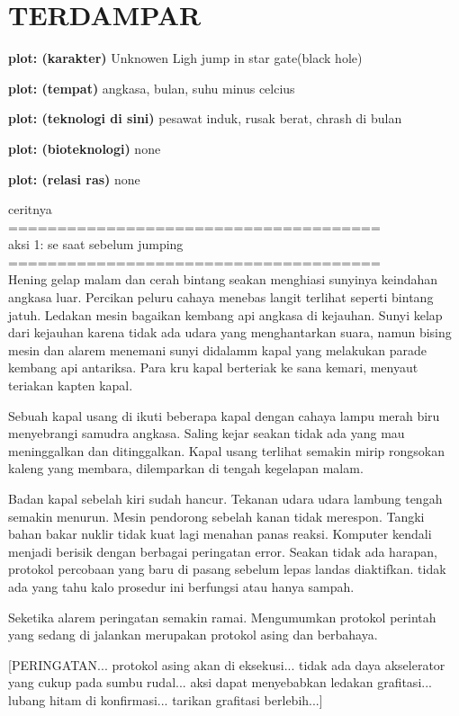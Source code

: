 \chapter{TERDAMPAR}

\textbf{plot: (karakter)} Unknowen Ligh jump in star gate(black hole)

\textbf{plot: (tempat)} angkasa, bulan, suhu minus celcius

\textbf{plot: (teknologi di sini)} pesawat induk, rusak berat, chrash di bulan

\textbf{plot: (bioteknologi)} none

\textbf{plot: (relasi ras)} none

ceritnya\\
======================================\\
aksi 1: se saat sebelum jumping\\
======================================\\

Hening gelap malam dan cerah bintang seakan menghiasi sunyinya keindahan angkasa luar. Percikan peluru cahaya menebas langit terlihat seperti bintang jatuh. Ledakan mesin bagaikan kembang api angkasa di kejauhan. Sunyi kelap dari kejauhan karena tidak ada udara yang menghantarkan suara, namun bising mesin dan alarem menemani sunyi didalamm kapal yang melakukan parade kembang api antariksa. Para kru kapal berteriak ke sana kemari, menyaut teriakan kapten kapal.

Sebuah kapal usang di ikuti beberapa kapal dengan cahaya lampu merah biru menyebrangi samudra angkasa. Saling kejar seakan tidak ada yang mau meninggalkan dan ditinggalkan. Kapal usang terlihat semakin mirip rongsokan kaleng yang membara, dilemparkan di tengah kegelapan malam.

Badan kapal sebelah kiri sudah hancur. Tekanan udara udara lambung tengah semakin menurun. Mesin pendorong sebelah kanan tidak merespon. Tangki bahan bakar nuklir tidak kuat lagi menahan panas reaksi. Komputer kendali menjadi berisik dengan berbagai peringatan error. Seakan tidak ada harapan, protokol percobaan yang baru di pasang sebelum lepas landas diaktifkan. tidak ada yang tahu kalo prosedur ini berfungsi atau hanya sampah.

Seketika alarem peringatan semakin ramai. Mengumumkan protokol perintah yang sedang di jalankan merupakan protokol asing dan berbahaya.

[PERINGATAN... protokol asing akan di eksekusi... tidak ada daya akselerator yang cukup pada sumbu rudal... aksi dapat menyebabkan ledakan grafitasi... lubang hitam di konfirmasi... tarikan grafitasi berlebih...]

